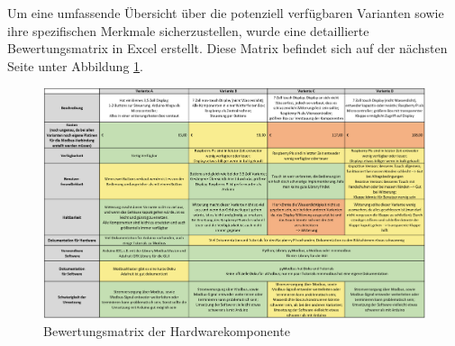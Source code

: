 Um eine umfassende Übersicht über die potenziell verfügbaren Varianten sowie ihre spezifischen Merkmale sicherzustellen, wurde eine detaillierte Bewertungsmatrix in Excel erstellt. Diese Matrix befindet sich auf der nächsten Seite unter Abbildung \ref{fig:matrix}.
\begin{landscape}
	\begin{figure}[H]
		\centering
		\includegraphics[width=1\linewidth]{Bilder/bewertungsmatrix}
		\caption{Bewertungsmatrix der Hardwarekomponente}
		\label{fig:matrix}
	\end{figure}
\end{landscape}